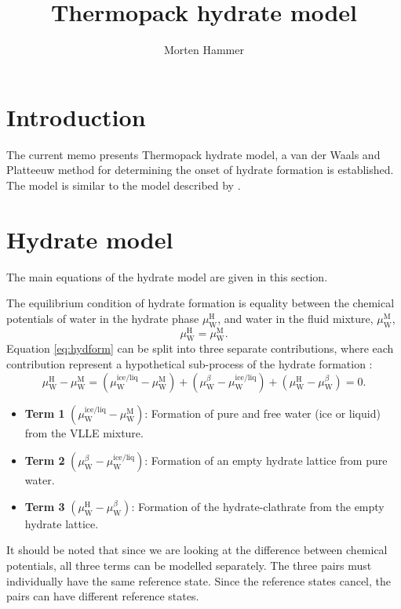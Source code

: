 \documentclass[english]{../thermomemo/thermomemo}
\title{Thermopack hydrate model}
\author{Morten Hammer}
\newcommand{\liq}{\text{liq}}
\newcommand{\hyd}{\text{H}}
\newcommand{\wat}{\text{W}}
\newcommand{\mix}{\text{M}}
\newcommand{\ice}{\text{ice}}
\newcommand{\free}{{\ice/\liq}}
\begin{document}
\frontmatter

\section{Introduction}
The current memo presents Thermopack hydrate model, a van der Waals
and Platteeuw method for determining the onset of hydrate formation is
established. The model is similar to the model described by
\citet{Chapoy2012}.

\section{Hydrate model}
The main equations of the hydrate model are given in this section.

The equilibrium condition of hydrate formation is equality between the
chemical potentials of water in the hydrate phase $\mu_\wat^\hyd$, and
water in the fluid mixture,
$\mu_\wat^\mix$,
\begin{equation}
\label{eq:hydform}
\mu_\wat^\hyd = \mu_\wat^\mix.
\end{equation}
Equation \eqref{eq:hydform} can be split into three separate
contributions, where each contribution represent a hypothetical
sub-process of the hydrate formation \citet{Sloan2008}:
\begin{equation}
\label{eq:hydsplit}
\mu_\wat^\hyd - \mu_\wat^\mix = \left( \mu_\wat^\free - \mu_\wat^\mix
\right) + \left( \mu_\wat^\beta - \mu_\wat^\free \right) + \left(
  \mu_\wat^\hyd - \mu_\wat^\beta \right) = 0.
\end{equation}

\begin{itemize}
\item \textbf{Term 1} $\left(\mu_\wat^\free - \mu_\wat^\mix\right)$: Formation of pure and free water (ice
  or liquid) from the VLLE mixture.
\item \textbf{Term 2} $\left(\mu_\wat^\beta - \mu_\wat^\free\right)$: Formation of an empty hydrate
  lattice from pure water.
\item \textbf{Term 3} $\left(\mu_\wat^\hyd - \mu_\wat^\beta\right)$: Formation of the
  hydrate-clathrate from the empty hydrate lattice.
\end{itemize}

It should be noted that since we are looking at the difference between
chemical potentials, all three terms can be modelled separately. The
three pairs must individually have the same reference state. Since
the reference states cancel, the pairs can have different reference
states.
\end{document}

